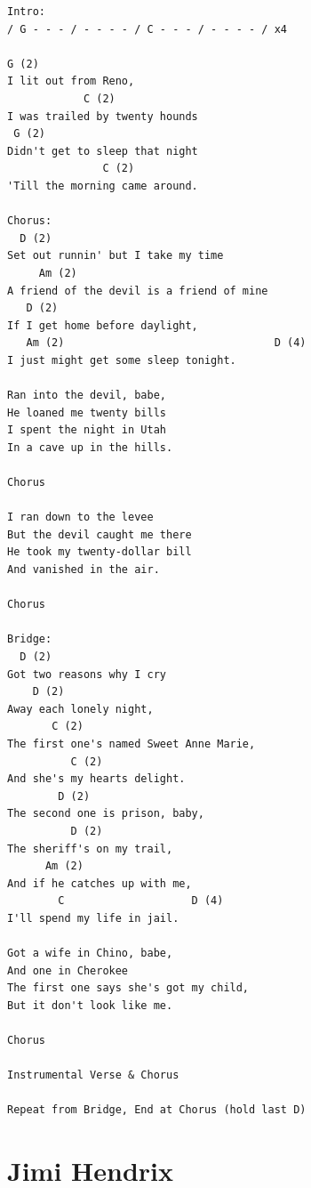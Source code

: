 \documentclass[a4paper]{article}
\begin{document}
\begin{Verbatim}[commandchars=\\\{\}]
Intro:
/ G - - - / - - - - / C - - - / - - - - / x4

G (2)
I lit out from Reno,
            C (2)
I was trailed by twenty hounds
 G (2)
Didn't get to sleep that night
               C (2)
'Till the morning came around.

Chorus:
  D (2)
Set out runnin' but I take my time
     Am (2)
A friend of the devil is a friend of mine
   D (2)
If I get home before daylight,
   Am (2)                                 D (4)
I just might get some sleep tonight.

Ran into the devil, babe,
He loaned me twenty bills
I spent the night in Utah
In a cave up in the hills.

Chorus

I ran down to the levee
But the devil caught me there
He took my twenty-dollar bill
And vanished in the air.

Chorus

Bridge:
  D (2)
Got two reasons why I cry
    D (2)
Away each lonely night,
       C (2)
The first one's named Sweet Anne Marie,
          C (2)                        
And she's my hearts delight.
        D (2)
The second one is prison, baby,
          D (2)
The sheriff's on my trail,
      Am (2)
And if he catches up with me,
        C                    D (4)
I'll spend my life in jail.

Got a wife in Chino, babe,
And one in Cherokee
The first one says she's got my child,
But it don't look like me.

Chorus

Instrumental Verse & Chorus

Repeat from Bridge, End at Chorus (hold last D)
\end{Verbatim}
\newpage
\section{Jimi Hendrix} %
\label{sec:Jimi Hendrix}
\end{document}

